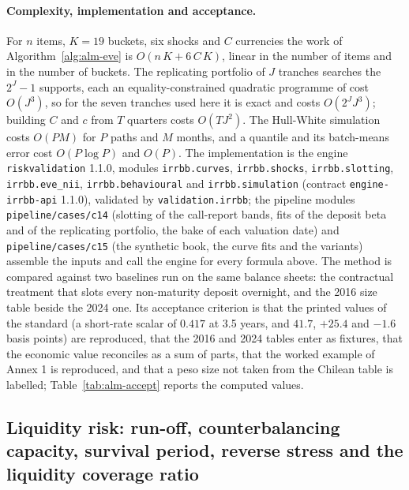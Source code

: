 \paragraph{Complexity, implementation and acceptance.}
{\sloppy For $n$ items, $K=19$ buckets, six shocks and $C$ currencies the work of Algorithm~\ref{alg:alm-eve} is $O(n\,K+6\,C\,K)$, linear in the number of items and in the number of buckets. The replicating portfolio of $J$ tranches searches the $2^{J}-1$ supports, each an equality-constrained quadratic programme of cost $O(J^{3})$, so for the seven tranches used here it is exact and costs $O(2^{J}J^{3})$; building $C$ and $c$ from $T$ quarters costs $O(TJ^{2})$. The Hull-White simulation costs $O(PM)$ for $P$ paths and $M$ months, and a quantile and its batch-means error cost $O(P\log P)$ and $O(P)$. The implementation is the engine \texttt{riskvalidation} 1.1.0, modules \texttt{irrbb.curves}, \texttt{irrbb.shocks}, \texttt{irrbb.slotting}, \texttt{irrbb.eve\_nii}, \texttt{irrbb.behavioural} and \texttt{irrbb.simulation} (contract \texttt{engine-irrbb-api} 1.1.0), validated by \texttt{validation.irrbb}; the pipeline modules \texttt{pipeline/cases/c14} (slotting of the call-report bands, fits of the deposit beta and of the replicating portfolio, the bake of each valuation date) and \texttt{pipeline/cases/c15} (the synthetic book, the curve fits and the variants) assemble the inputs and call the engine for every formula above. The method is compared against two baselines run on the same balance sheets: the contractual treatment that slots every non-maturity deposit overnight, and the 2016 size table beside the 2024 one. Its acceptance criterion is that the printed values of the standard (a short-rate scalar of $0.417$ at 3.5 years, and $41.7$, $+25.4$ and $-1.6$ basis points) are reproduced, that the 2016 and 2024 tables enter as fixtures, that the economic value reconciles as a sum of parts, that the worked example of Annex 1 is reproduced, and that a peso size not taken from the Chilean table is labelled; Table~\ref{tab:alm-accept} reports the computed values.\par}

\subsection{Liquidity risk: run-off, counterbalancing capacity, survival period, reverse stress and the liquidity coverage ratio}
\label{sec:m23}

